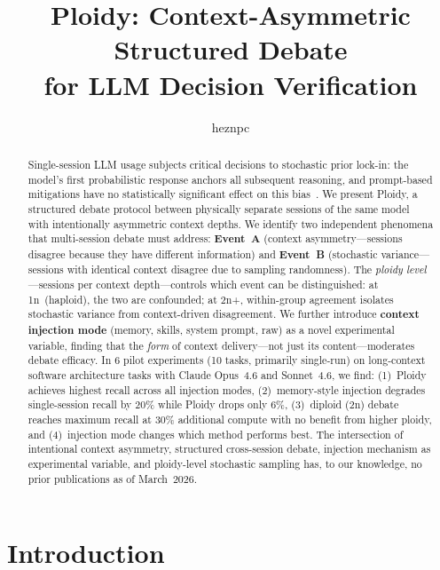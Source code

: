 \documentclass[11pt]{article}
\title{Ploidy: Context-Asymmetric Structured Debate\\for LLM Decision Verification}
\author{heznpc}
\date{}
\begin{document}
\maketitle

\begin{abstract}
Single-session LLM usage subjects critical decisions to stochastic prior lock-in: the model's first probabilistic response anchors all subsequent reasoning, and prompt-based mitigations have no statistically significant effect on this bias~\citep{feng2026anchoring}. We present Ploidy, a structured debate protocol between physically separate sessions of the same model with intentionally asymmetric context depths. We identify two independent phenomena that multi-session debate must address: \textbf{Event~A} (context asymmetry---sessions disagree because they have different information) and \textbf{Event~B} (stochastic variance---sessions with identical context disagree due to sampling randomness). The \emph{ploidy level}---sessions per context depth---controls which event can be distinguished: at 1n~(haploid), the two are confounded; at 2n+, within-group agreement isolates stochastic variance from context-driven disagreement. We further introduce \textbf{context injection mode} (memory, skills, system prompt, raw) as a novel experimental variable, finding that the \emph{form} of context delivery---not just its content---moderates debate efficacy. In 6 pilot experiments (10 tasks, primarily single-run) on long-context software architecture tasks with Claude Opus~4.6 and Sonnet~4.6, we find: (1)~Ploidy achieves highest recall across all injection modes, (2)~memory-style injection degrades single-session recall by 20\% while Ploidy drops only 6\%, (3)~diploid (2n) debate reaches maximum recall at 30\% additional compute with no benefit from higher ploidy, and (4)~injection mode changes which method performs best. The intersection of intentional context asymmetry, structured cross-session debate, injection mechanism as experimental variable, and ploidy-level stochastic sampling has, to our knowledge, no prior publications as of March~2026.
\end{abstract}

\section{Introduction}
\label{sec:introduction}
\end{document}
